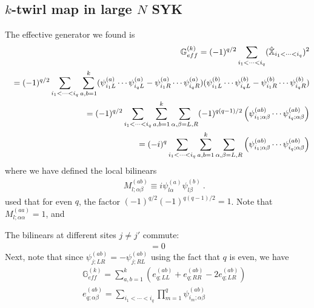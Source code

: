 \documentclass{article}
\theoremstyle{definition}
\newcommand{\nn}{\nonumber}
\newcommand{\lb}{\left(}
\newcommand{\rb}{\right)}
\newcommand{\NL}[1]{\textcolor{blue}{#1}}
\begin{document}



    \subsection{$k$-twirl map in large $N$ SYK}

    The effective generator we found is
    \begin{eqnarray}
        \allowdisplaybreaks &&\mathbb{G}_{eff}^{(k)}=(-1)^{q/2}\sum_{i_1<\cdots <i_q}(\hat{\mathbb{X}}_{i_1<\cdots <i_q})^2\nn\\
        &&=(-1)^{q/2}\sum_{i_1<\cdots <i_q}\sum_{a,b=1}^k(\psi_{i_1L}^{(a)}\cdots
        \psi_{i_qL}^{(a)}-\psi_{i_1R}^{(a)}\cdots \psi_{i_qR}^{(a)})(\psi_{i_1L}^{(b)}\cdots
        \psi_{i_qL}^{(b)}-\psi_{i_1R}^{(b)}\cdots \psi_{i_qR}^{(b)})\nn\\
        &&=(-1)^{q/2}\sum_{i_1<\cdots <i_q}\sum_{a,b=1}^k\sum_{\alpha,\beta=L,R}(-1)^{q(q-1)/2}\lb
        \psi^{(ab)}_{i_1;\alpha\beta}\cdots \psi^{(ab)}_{i_q;\alpha\beta}\rb\nn\\
        &&=(-i)^q\sum_{i_1<\cdots <i_q}\sum_{a,b=1}^k\sum_{\alpha,\beta=L,R}\lb
        \psi^{(ab)}_{i_1;\alpha\beta}\cdots \psi^{(ab)}_{i_q;\alpha\beta}\rb\label{Geffk}
    \end{eqnarray}
    where we have defined the local bilinears
    \begin{eqnarray}
        \label{bilinearpsi} &&M^{(ab)}_{l;\alpha\beta}\equiv i\psi^{(a)}_{l \alpha}\psi^{(b)}_{l\beta}\ .
    \end{eqnarray}
    used that for even $q$, the factor $(-1)^{q/2}(-1)^{q(q-1)/2}=1$.
    Note that $M^{(aa)}_{l;\alpha\alpha}=1$, and

    The bilinears at different sites $j\neq j'$ commute:
    \begin{eqnarray}
        [M^{(ab)}_{j;\alpha\beta},M^{(a'b')}_{j';\alpha'\beta'}]=0
    \end{eqnarray}
    Next, note that since $\psi_{j;LR}^{(ab)}=-\psi_{j;RL}^{(ab)}$ using the
    fact that $q$ is even, we have
    \begin{eqnarray}
        &&\mathbb{G}_{eff}^{(k)}= \sum_{a,b=1}^k\lb e_{q;LL}^{(ab)}+e_{q;RR}^{(ab)}-2e_{q;LR}^{(ab)}\rb\\
        &&e_{q;\alpha\beta}^{(ab)}=\sum_{i_1<\cdots <i_q}\prod_{m=1}^q\psi^{(ab)}_{i_m;\alpha\beta}
    \end{eqnarray}
\end{document}
